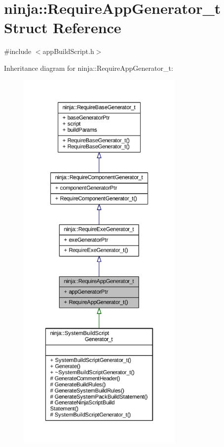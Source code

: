 \hypertarget{structninja_1_1_require_app_generator__t}{}\section{ninja\+:\+:Require\+App\+Generator\+\_\+t Struct Reference}
\label{structninja_1_1_require_app_generator__t}


{\ttfamily \#include $<$app\+Build\+Script.\+h$>$}



Inheritance diagram for ninja\+:\+:Require\+App\+Generator\+\_\+t\+:
\nopagebreak
\begin{figure}[H]
\begin{center}
\leavevmode
\includegraphics[height=550pt]{structninja_1_1_require_app_generator__t__inherit__graph}
\end{center}
\end{figure}


